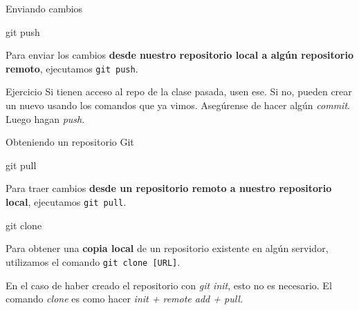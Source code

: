 \begin{frame}[t]{Enviando cambios}
    \begin{comando}
        git push
    \end{comando}

    \pause
    \begin{block}{}
        Para enviar los cambios \textbf{desde nuestro repositorio local a algún
        repositorio remoto}, ejecutamos \texttt{git push}.
    \end{block}

    \begin{ejercicio}{Ejercicio}
        Si tienen acceso al repo de la clase pasada, usen ese. Si no, pueden crear un nuevo usando los comandos que ya vimos. Asegúrense de hacer algún \textit{commit}. Luego hagan \textit{push}. 
    \end{ejercicio}
\end{frame}


\begin{frame}[t]{Obteniendo un repositorio Git}
        \begin{comando}
        git pull
    \end{comando}

    \begin{block}{}
        Para traer cambios \textbf{desde un repositorio remoto a nuestro repositorio local},
        ejecutamos \texttt{git pull}.
    \end{block}
    \pause
    \begin{comando}
        git clone
    \end{comando}

	\begin{block}{}
        Para obtener una \textbf{copia local} de un repositorio existente en algún servidor,
        utilizamos el comando \texttt{git clone [URL]}.

        En el caso de haber creado el repositorio con \textit{git init}, esto no es necesario. El comando \textit{clone} es como hacer \textit{init + remote add + pull}.
    \end{block}
\end{frame}


